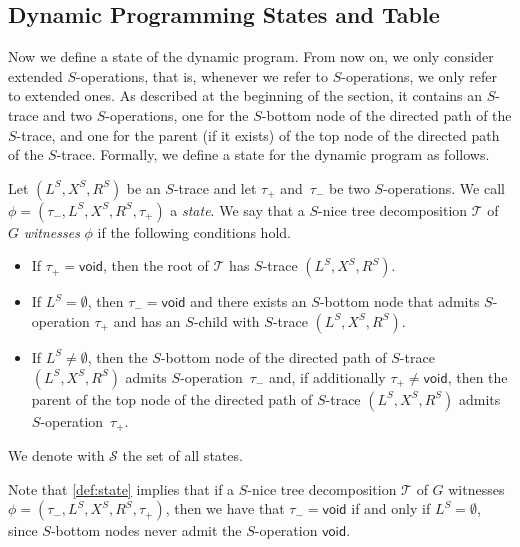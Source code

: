 \documentclass[a4paper,UKenglish,cleveref, autoref, thm-restate, numberwithinsect]{lipics-v2021}
\newcommand{\void}{\mathsf{void}}
\newcommand{\slim}{\text{slim}\xspace}
\begin{document}
\subsection{Dynamic Programming States and Table}\label{sec:statestable}
Now we define a state of the dynamic program. From now on, we only consider extended $S$-operations, that is, whenever we refer to $S$-operations, we only refer to extended ones. As described at the beginning of the section, it contains an $S$-trace and two $S$-operations, one for the $S$-bottom node of the directed path of the $S$-trace, and one for the parent (if it exists) of the top node of the directed path of the $S$-trace. 
Formally, we define a state for the dynamic program as follows.
\begin{definition}\label{def:state}
    Let $(L^S, X^S, R^S)$ be an $S$-trace and let $\tau_+$ and~$\tau_-$ be two $S$-operations. We call $\phi=(\tau_-,L^S, X^S, R^S,\tau_+)$ a \emph{state}. 
We say that a \slim $S$-nice tree decomposition $\mathcal{T}$ of $G$ \emph{witnesses} $\phi$ if the following conditions hold.
    \begin{itemize}
    \item If $\tau_+=\void$, then the root of $\mathcal{T}$ has $S$-trace $(L^S, X^S, R^S)$.
        \item If $L^S=\emptyset$, then $\tau_-=\void$ and there exists an $S$-bottom node that admits $S$-operation $\tau_+$ and has an $S$-child with $S$-trace $(L^S, X^S, R^S)$.
        \item If $L^S\neq\emptyset$, then the $S$-bottom node of the directed path of $S$-trace $(L^S, X^S, R^S)$ admits $S$-operation~$\tau_-$ and, if additionally $\tau_+\neq\void$, then the parent of the top node of the directed path of $S$-trace $(L^S, X^S, R^S)$ admits $S$-operation~$\tau_+$.
    \end{itemize} 
    We denote with $\mathcal{S}$ the set of all states.
\end{definition}
Note that \cref{def:state} implies that if a \slim $S$-nice tree decomposition $\mathcal{T}$ of $G$ witnesses $\phi=(\tau_-,L^S, X^S, R^S,\tau_+)$, then we have that $\tau_-=\void$ if and only if $L^S=\emptyset$, since $S$-bottom nodes never admit the $S$-operation $\void$.
\end{document}
